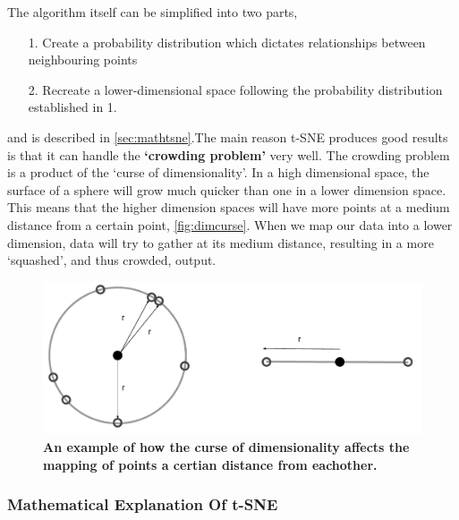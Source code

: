 The algorithm itself can be simplified into two parts,

\begin{itemize}
  \item [1.] Create a probability distribution which dictates relationships between neighbouring points
  \item [2.] Recreate a lower-dimensional space following the probability distribution established in 1.
\end{itemize}

and is described in \autoref{sec:mathtsne}.The main reason t-SNE produces good results is that it can handle the \textbf{`crowding problem'} very well. The crowding problem is a product of the `curse of dimensionality'. In a high dimensional space, the surface of a sphere will grow much quicker than one in a lower dimension space. This means that the higher dimension spaces will have more points at a medium distance from a certain point, \autoref{fig:dimcurse}. When we map our data into a lower dimension, data will try to gather at its medium distance, resulting in a more `squashed', and thus crowded, output.



\begin{figure}[H]
  \centering
\includegraphics[width=.5\textwidth]{4fig/dimcurse.pdf}
\caption{\textbf{An example of how the curse of dimensionality affects the mapping of points a certian distance from eachother.} }\label{fig:dimcurse}
\end{figure}




\subsubsection{Mathematical Explanation Of t-SNE}\label{sec:mathtsne}

%

